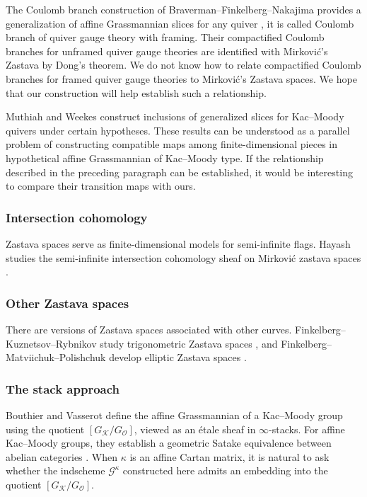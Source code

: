 \documentclass{amsart}
\numberwithin{equation}{section}
\numberwithin{figure}{section}
\theoremstyle{definition}
\theoremstyle{remark}
\begin{document}
The Coulomb branch construction of Braverman--Finkelberg--Nakajima
provides a generalization of affine Grassmannian slices
for any quiver \cite{BFN2}, it is called Coulomb branch of quiver gauge theory with framing. Their compactified Coulomb branches
for unframed quiver gauge theories are identified with Mirkovi\'c's
Zastava by Dong's theorem\cite{dong2026loop}. We do not know how to relate compactified Coulomb branches for framed quiver gauge theories to Mirković’s Zastava spaces. We hope that our construction will help establish such a relationship.

Muthiah and Weekes \cite{muthiah2024fundamental,muthiah2026coulomb} construct inclusions of generalized slices for Kac–Moody quivers under certain hypotheses. These results can be understood as a parallel problem of constructing compatible maps among finite-dimensional pieces in hypothetical affine Grassmannian of Kac--Moody type. If the relationship described in the preceding paragraph can be established, it would be interesting to compare their transition maps with ours.

\subsubsection{Intersection cohomology}

Zastava spaces serve as finite-dimensional models for
semi-infinite flags. Hayash studies the semi-infinite
intersection cohomology sheaf
 on Mirkovi\'c zastava spaces \cite{hayash2025semiinfinite}.

\subsubsection{Other Zastava spaces}

There are versions of Zastava spaces associated
with other curves. Finkelberg--Kuznetsov--Rybnikov study
trigonometric Zastava spaces \cite{finkelberg2018towards}, and 
Finkelberg--Matviichuk--Polishchuk develop elliptic
Zastava spaces \cite{finkelberg2023elliptic}.


\subsubsection{The stack approach}
Bouthier and Vasserot define the affine Grassmannian of a Kac–Moody group using the quotient \([G_{\mathcal K}/G_{\mathcal O}]\), viewed as an étale sheaf in \(\infty\)-stacks. For affine Kac–Moody groups, they establish a geometric Satake equivalence between abelian categories \cite{bouthier2025satake}.
When $\kappa$ is an affine Cartan matrix, it is natural to ask whether the indscheme \(\mathcal G^\kappa\) constructed here admits an embedding into the quotient \([G_{\mathcal K}/G_{\mathcal O}]\).
\end{document}
